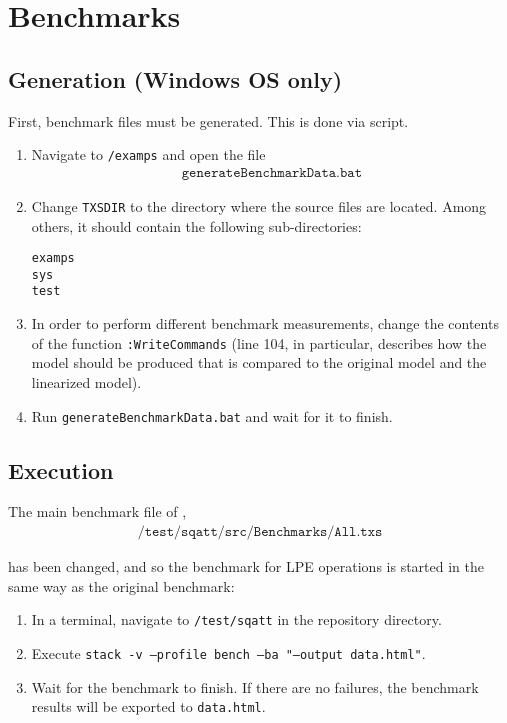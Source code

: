 \section{Benchmarks}

\subsection{Generation (Windows OS only)}
First, benchmark files must be generated.
This is done via script.

\begin{enumerate}
\item Navigate to \texttt{/examps} and open the file
\begin{align*}
\texttt{generateBenchmarkData.bat}
\end{align*}

\item Change \texttt{TXSDIR} to the directory where the \txs{} source files are located.
Among others, it should contain the following sub-directories:
\begin{center}
\texttt{examps} \\
\texttt{sys} \\
\texttt{test}
\end{center}

\item In order to perform different benchmark measurements, change the contents of the function \texttt{:WriteCommands} (line 104, in particular, describes how the model should be produced that is compared to the original model and the linearized model).

\item Run \texttt{generateBenchmarkData.bat} and wait for it to finish.
\end{enumerate}

\subsection{Execution}
The main benchmark file of \txs{},
\begin{align*}
\texttt{/test/sqatt/src/Benchmarks/All.txs}
\end{align*}

has been changed, and so the benchmark for LPE operations is started in the same way as the original benchmark:

\begin{enumerate}
\item In a terminal, navigate to \texttt{/test/sqatt} in the repository directory.
\item Execute \texttt{stack -v --profile bench --ba "--output data.html"}.
\item Wait for the benchmark to finish.
If there are no failures, the benchmark results will be exported to \texttt{data.html}.
\end{enumerate}

